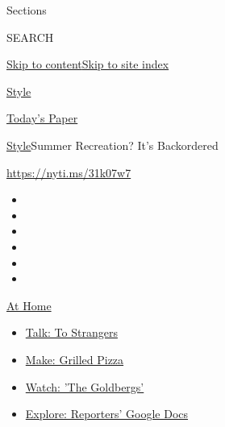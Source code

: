 Sections

SEARCH

\protect\hyperlink{site-content}{Skip to
content}\protect\hyperlink{site-index}{Skip to site index}

\href{https://www.nytimes3xbfgragh.onion/section/style}{Style}

\href{https://myaccount.nytimes3xbfgragh.onion/auth/login?response_type=cookie\&client_id=vi}{}

\href{https://www.nytimes3xbfgragh.onion/section/todayspaper}{Today's
Paper}

\href{/section/style}{Style}\textbar{}Summer Recreation? It's
Backordered

\url{https://nyti.ms/31k07w7}

\begin{itemize}
\item
\item
\item
\item
\item
\item
\end{itemize}

\href{https://www.nytimes3xbfgragh.onion/spotlight/at-home?action=click\&pgtype=Article\&state=default\&region=TOP_BANNER\&context=at_home_menu}{At
Home}

\begin{itemize}
\tightlist
\item
  \href{https://www.nytimes3xbfgragh.onion/2020/08/03/well/family/the-benefits-of-talking-to-strangers.html?action=click\&pgtype=Article\&state=default\&region=TOP_BANNER\&context=at_home_menu}{Talk:
  To Strangers}
\item
  \href{https://www.nytimes3xbfgragh.onion/2020/08/01/at-home/coronavirus-make-pizza-on-a-grill.html?action=click\&pgtype=Article\&state=default\&region=TOP_BANNER\&context=at_home_menu}{Make:
  Grilled Pizza}
\item
  \href{https://www.nytimes3xbfgragh.onion/2020/07/31/arts/television/goldbergs-abc-stream.html?action=click\&pgtype=Article\&state=default\&region=TOP_BANNER\&context=at_home_menu}{Watch:
  'The Goldbergs'}
\item
  \href{https://www.nytimes3xbfgragh.onion/interactive/2020/at-home/even-more-reporters-editors-diaries-lists-recommendations.html?action=click\&pgtype=Article\&state=default\&region=TOP_BANNER\&context=at_home_menu}{Explore:
  Reporters' Google Docs}
\end{itemize}

